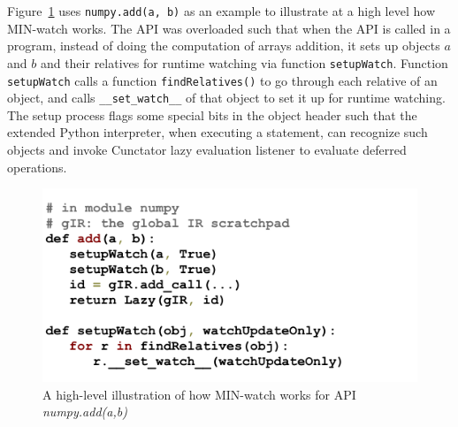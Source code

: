\documentclass[sigconf]{acmart}\settopmatter{printfolios=true,printccs=false,printacmref=false}\setcopyright{none}
\begin{document}




Figure~\ref{fig:overviewWatch} uses \texttt{numpy.add(a, b)} as an example to illustrate at a high level how MIN-watch works. The API was overloaded such that when the API is called in a program, instead of doing the computation of arrays addition, it sets up objects $a$ and $b$ and their relatives for runtime watching via function \texttt{setupWatch}. Function \texttt{setupWatch} calls a function \texttt{findRelatives()} to go through each relative of an object, and calls \texttt{\_\_set\_watch\_\_} of that object to set it up for runtime watching. The setup process flags some special bits in the object header such that the extended Python interpreter, when executing a statement, can recognize such objects and invoke Cunctator lazy evaluation listener to evaluate deferred operations. 

\begin{figure}
    \centering
    \includegraphics[width=0.8\columnwidth]{figure/watch_overview.pdf}
    \caption{A high-level illustration of how MIN-watch works for API \textit{numpy.add(a,b)}}
    \label{fig:overviewWatch}
\end{figure}
\end{document}
